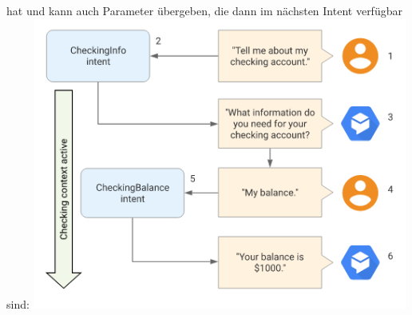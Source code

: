 hat und kann auch Parameter übergeben, die dann im nächsten Intent verfügbar sind:
\includegraphics[width=\linewidth]{img/dialog-control.png}